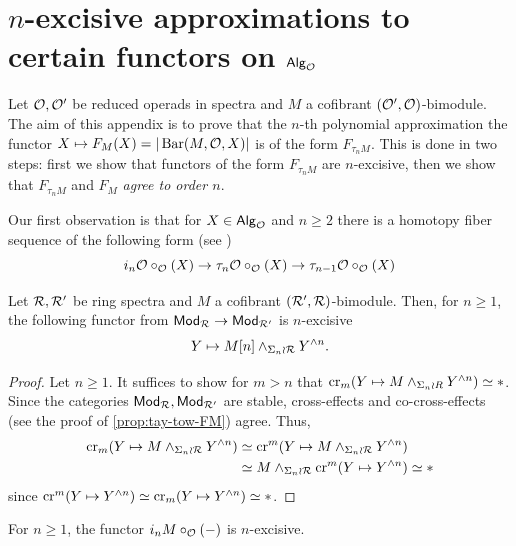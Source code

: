 \section{$n$-excisive approximations to certain functors on ${\mathsf{Alg}_{\mathcal{O}}}$} Let $\mathcal{O},\mathcal{O}'$ be reduced operads in spectra and $M$ a cofibrant $(\mathcal{O}',\mathcal{O})$-bimodule. The aim of this appendix is to prove that the $n$-th polynomial approximation the functor $X\mapsto F_{M}(X)=|\operatorname{Bar}(M, \mathcal{O},X)|$ is of the form $F_{\tau_n M}$. This is done in two steps: first we show that functors of the form $F_{\tau_n M}$ are $n$-excisive, then we show that $F_{\tau_n M}$ and $F_M$ \textit{agree to order $n$}.

Our first observation is that for $X\in {\mathsf{Alg}_{\mathcal{O}}}$ and $n\geq 2$ there is a homotopy fiber sequence of the following form (see \cite[2.11(b)]{KuhPer}) \begin{equation}
\label{D_n-fib-seq} i_n \mathcal{O} \circ_{\mathcal{O}} (X)\to \tau_n \mathcal{O} \circ_{\mathcal{O}}(X) \to \tau_{n-1} \mathcal{O} \circ_{\mathcal{O}}(X)
\end{equation}


\begin{proposition} \label{prop:n-exc}
Let $\mathcal{R},\mathcal{R}'$ be ring spectra and $M$ a cofibrant $(\mathcal{R}',\mathcal{R})$-bimodule. Then, for $n\geq 1$, the following functor from $\mathsf{Mod}_{\mathcal{R}}\to\mathsf{Mod}_{\mathcal{R}'}$ is $n$-excisive \[Y\mapsto M[n] \wedge_{\Sigma_n \wr \mathcal{R}} Y^{\wedge n}.\]
\end{proposition}

\begin{proof}
    Let $n\geq 1$. It suffices to show for $m>n$ that $\operatorname{cr}_{m} (Y\mapsto M \wedge_{\Sigma_n \wr R} Y^{\wedge n}) \simeq *$. Since the categories $\mathsf{Mod}_{\mathcal{R}}, \mathsf{Mod}_{\mathcal{R}'}$ are stable, cross-effects and co-cross-effects (see the proof of \ref{prop:tay-tow-FM}) agree. Thus, \begin{align*} 
        \operatorname{cr}_{m} (Y \mapsto M \wedge_{\Sigma_n \wr \mathcal{R}} Y^{\wedge n} ) 
        & \simeq \operatorname{cr}^{m} ( Y \mapsto M \wedge_{\Sigma_n \wr \mathcal{R}} Y^{\wedge n} ) \\
        & \simeq M \wedge_{\Sigma_n \wr \mathcal{R}} \operatorname{cr}^{m}( Y\mapsto Y^{\wedge n}) \simeq *
        \end{align*}
    since $\operatorname{cr}^{m}( Y\mapsto Y^{\wedge n})\simeq \operatorname{cr}_m (Y\mapsto Y^{\wedge n})\simeq *$. 
\end{proof}

\begin{corollary} \label{D_n-n-exc}
    For $n\geq 1$, the functor $i_n M\circ_{\mathcal{O}}(-)$ is $n$-excisive. 
\end{corollary}

